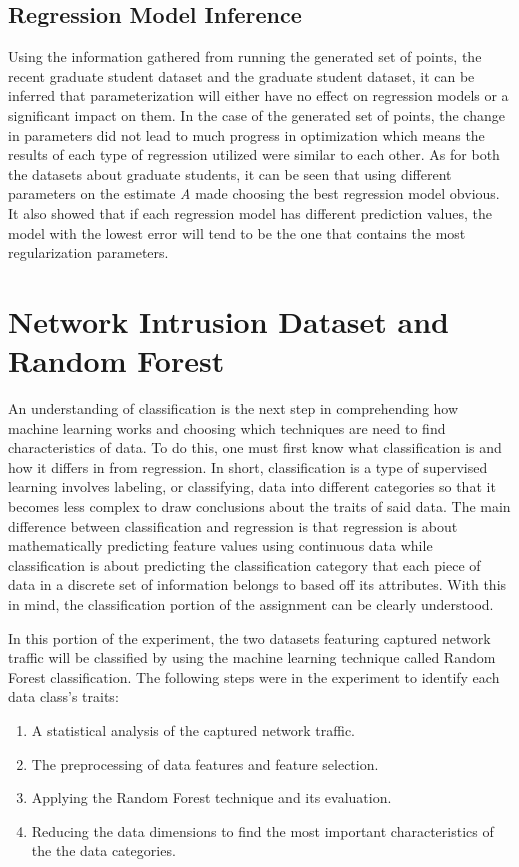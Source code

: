 \documentclass[a4paper,12pt]{IEEEtran}
\begin{document}
\subsection{Regression Model Inference}
\label{reg_summary}
Using the information gathered from running the generated set of points, the recent graduate student dataset and the graduate student dataset, it can be inferred that parameterization will either have no effect on regression models or a significant impact on them. In the case of the generated set of points, the change in parameters did not lead to much progress in optimization which means the results of each type of regression utilized were similar to each other. As for both the datasets about graduate students, it can be seen that using different parameters on the estimate \textit{A} made choosing the best regression model obvious. It also showed that if each regression model has different prediction values, the model with the lowest error will tend to be the one that contains the most regularization parameters.

\section{Network Intrusion Dataset and Random Forest}
An understanding of classification is the next step in comprehending how machine learning works and choosing which techniques are need to find characteristics of data. To do this, one must first know what classification is and how it differs in from regression. In short, classification is a type of supervised learning involves labeling, or classifying, data into different categories so that it becomes less complex to draw conclusions about the traits of said data. The main difference between classification and regression is that regression is about mathematically predicting feature values using continuous data while classification is about predicting the classification category that each piece of data in a discrete set of information belongs to based off its attributes. With this in mind, the classification portion of the assignment can be clearly understood.

In this portion of the experiment, the two datasets featuring captured network traffic will be classified by using the machine learning technique called Random Forest classification. The following steps were in the experiment to identify each data class's traits:
\begin{enumerate}
\item A statistical analysis of the captured network traffic.
\item The preprocessing of data features and feature selection.
\item Applying the Random Forest technique and its evaluation.
\item Reducing the data dimensions to find the most important characteristics of the the data categories.
\end{enumerate}
\end{document}
